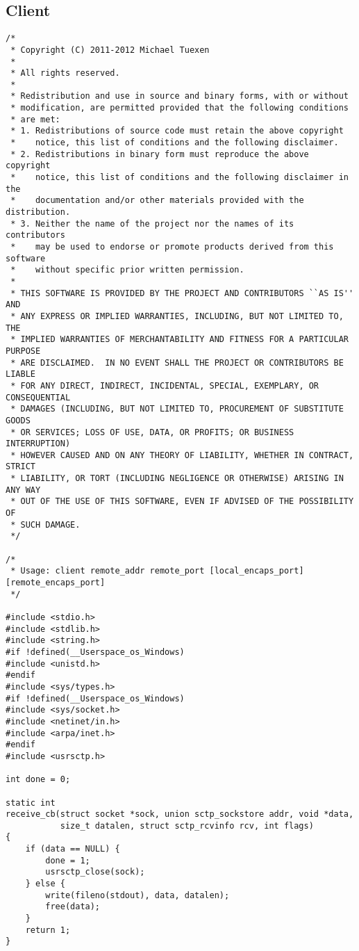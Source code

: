 \documentclass[a4paper]{article}
\begin{document}
\subsection{Client}
\begin{verbatim}
/*
 * Copyright (C) 2011-2012 Michael Tuexen
 *
 * All rights reserved.
 *
 * Redistribution and use in source and binary forms, with or without
 * modification, are permitted provided that the following conditions
 * are met:
 * 1. Redistributions of source code must retain the above copyright
 *    notice, this list of conditions and the following disclaimer.
 * 2. Redistributions in binary form must reproduce the above copyright
 *    notice, this list of conditions and the following disclaimer in the
 *    documentation and/or other materials provided with the distribution.
 * 3. Neither the name of the project nor the names of its contributors
 *    may be used to endorse or promote products derived from this software
 *    without specific prior written permission.
 *
 * THIS SOFTWARE IS PROVIDED BY THE PROJECT AND CONTRIBUTORS ``AS IS'' AND
 * ANY EXPRESS OR IMPLIED WARRANTIES, INCLUDING, BUT NOT LIMITED TO, THE
 * IMPLIED WARRANTIES OF MERCHANTABILITY AND FITNESS FOR A PARTICULAR PURPOSE
 * ARE DISCLAIMED.	IN NO EVENT SHALL THE PROJECT OR CONTRIBUTORS BE LIABLE
 * FOR ANY DIRECT, INDIRECT, INCIDENTAL, SPECIAL, EXEMPLARY, OR CONSEQUENTIAL
 * DAMAGES (INCLUDING, BUT NOT LIMITED TO, PROCUREMENT OF SUBSTITUTE GOODS
 * OR SERVICES; LOSS OF USE, DATA, OR PROFITS; OR BUSINESS INTERRUPTION)
 * HOWEVER CAUSED AND ON ANY THEORY OF LIABILITY, WHETHER IN CONTRACT, STRICT
 * LIABILITY, OR TORT (INCLUDING NEGLIGENCE OR OTHERWISE) ARISING IN ANY WAY
 * OUT OF THE USE OF THIS SOFTWARE, EVEN IF ADVISED OF THE POSSIBILITY OF
 * SUCH DAMAGE.
 */

/*
 * Usage: client remote_addr remote_port [local_encaps_port] [remote_encaps_port]
 */

#include <stdio.h>
#include <stdlib.h>
#include <string.h>
#if !defined(__Userspace_os_Windows)
#include <unistd.h>
#endif
#include <sys/types.h>
#if !defined(__Userspace_os_Windows)
#include <sys/socket.h>
#include <netinet/in.h>
#include <arpa/inet.h>
#endif
#include <usrsctp.h>

int done = 0;

static int
receive_cb(struct socket *sock, union sctp_sockstore addr, void *data,
           size_t datalen, struct sctp_rcvinfo rcv, int flags)
{
	if (data == NULL) {
		done = 1;
		usrsctp_close(sock);
	} else {
		write(fileno(stdout), data, datalen);
		free(data);
	}
	return 1;
}


\end{verbatim}
\end{document}
